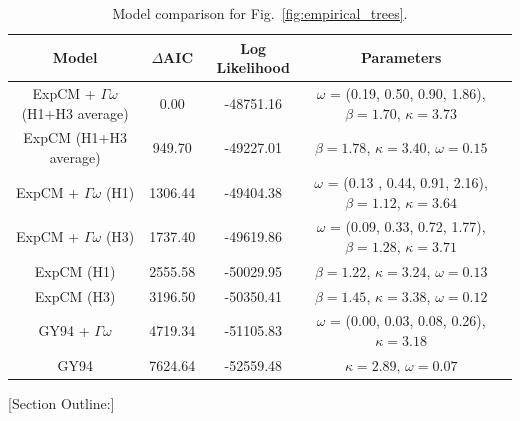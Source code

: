 \documentclass[11pt]{article}
\newcommand\skhcomment[1]{{\color{cyan}[#1]}}
\begin{document}
\begin{table}[t!]
\caption{\label{tab:empirical_data}
Model comparison for Fig.~\ref{fig:empirical_trees}.}
     \begin{tabular}{ccccc}
        \hline
          Model & $\Delta$AIC & Log Likelihood & Parameters\\ \hline
       	ExpCM + $\Gamma\omega$ (H1+H3 average) & 0.00 & -48751.16 & $\omega$ = (0.19,  0.50,  0.90,  1.86), $\beta=1.70$, $\kappa=3.73$\\
	ExpCM (H1+H3 average) & 949.70 & -49227.01 & $\beta=1.78$, $\kappa=3.40$, $\omega=0.15$\\
	ExpCM + $\Gamma\omega$ (H1) & 1306.44 & -49404.38  & $\omega$ = (0.13 ,  0.44,  0.91,  2.16), $\beta=1.12$, $\kappa=3.64$\\
	ExpCM + $\Gamma\omega$ (H3) & 1737.40 & -49619.86 & $\omega$ = (0.09,  0.33,  0.72,  1.77), $\beta=1.28$, $\kappa=3.71$\\
	ExpCM (H1) & 2555.58 & -50029.95 & $\beta=1.22$, $\kappa=3.24$, $\omega=0.13$\\
	ExpCM (H3) & 3196.50 & -50350.41 & $\beta=1.45$, $\kappa=3.38$, $\omega=0.12$\\
	GY94 + $\Gamma\omega$ & 4719.34 & -51105.83 & $\omega$ = (0.00,  0.03,  0.08,  0.26), $\kappa=3.18$\\
	GY94 & 7624.64 & -52559.48  & $\kappa=2.89$, $\omega=0.07$\\
      \end{tabular}
\end{table}

\skhcomment{Section Outline:}
\end{document}
